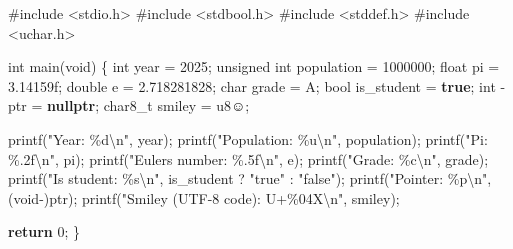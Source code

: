 \documentclass[
  letterpaper,
  DIV=11,
  numbers=noendperiod]{scrreprt}
\newenvironment{Shaded}{\begin{snugshade}}{\end{snugshade}}
\newcommand{\BuiltInTok}[1]{\textcolor[rgb]{0.00,0.23,0.31}{#1}}
\newcommand{\CharTok}[1]{\textcolor[rgb]{0.13,0.47,0.30}{#1}}
\newcommand{\ControlFlowTok}[1]{\textcolor[rgb]{0.00,0.23,0.31}{\textbf{#1}}}
\newcommand{\DataTypeTok}[1]{\textcolor[rgb]{0.68,0.00,0.00}{#1}}
\newcommand{\DecValTok}[1]{\textcolor[rgb]{0.68,0.00,0.00}{#1}}
\newcommand{\FloatTok}[1]{\textcolor[rgb]{0.68,0.00,0.00}{#1}}
\newcommand{\ImportTok}[1]{\textcolor[rgb]{0.00,0.46,0.62}{#1}}
\newcommand{\KeywordTok}[1]{\textcolor[rgb]{0.00,0.23,0.31}{\textbf{#1}}}
\newcommand{\NormalTok}[1]{\textcolor[rgb]{0.00,0.23,0.31}{#1}}
\newcommand{\OperatorTok}[1]{\textcolor[rgb]{0.37,0.37,0.37}{#1}}
\newcommand{\PreprocessorTok}[1]{\textcolor[rgb]{0.68,0.00,0.00}{#1}}
\newcommand{\SpecialCharTok}[1]{\textcolor[rgb]{0.37,0.37,0.37}{#1}}
\newcommand{\StringTok}[1]{\textcolor[rgb]{0.13,0.47,0.30}{#1}}
\begin{document}
\begin{Shaded}
\begin{Highlighting}[]
\PreprocessorTok{\#include }\ImportTok{\textless{}stdio.h\textgreater{}}
\PreprocessorTok{\#include }\ImportTok{\textless{}stdbool.h\textgreater{}}
\PreprocessorTok{\#include }\ImportTok{\textless{}stddef.h\textgreater{}}
\PreprocessorTok{\#include }\ImportTok{\textless{}uchar.h\textgreater{}}

\DataTypeTok{int}\NormalTok{ main}\OperatorTok{(}\DataTypeTok{void}\OperatorTok{)} \OperatorTok{\{}
    \DataTypeTok{int}\NormalTok{ year }\OperatorTok{=} \DecValTok{2025}\OperatorTok{;}
    \DataTypeTok{unsigned} \DataTypeTok{int}\NormalTok{ population }\OperatorTok{=} \DecValTok{1000000}\OperatorTok{;}
    \DataTypeTok{float}\NormalTok{ pi }\OperatorTok{=} \FloatTok{3.14159}\BuiltInTok{f}\OperatorTok{;}
    \DataTypeTok{double}\NormalTok{ e }\OperatorTok{=} \FloatTok{2.718281828}\OperatorTok{;}
    \DataTypeTok{char}\NormalTok{ grade }\OperatorTok{=} \CharTok{\textquotesingle{}A\textquotesingle{}}\OperatorTok{;}
    \DataTypeTok{bool}\NormalTok{ is\_student }\OperatorTok{=} \KeywordTok{true}\OperatorTok{;}
    \DataTypeTok{int} \OperatorTok{{-}}\NormalTok{ptr }\OperatorTok{=} \KeywordTok{nullptr}\OperatorTok{;}
\NormalTok{    char8\_t smiley }\OperatorTok{=} \CharTok{u8\textquotesingle{}☺\textquotesingle{}}\OperatorTok{;}

\NormalTok{    printf}\OperatorTok{(}\StringTok{"Year: }\SpecialCharTok{\%d\textbackslash{}n}\StringTok{"}\OperatorTok{,}\NormalTok{ year}\OperatorTok{);}
\NormalTok{    printf}\OperatorTok{(}\StringTok{"Population: }\SpecialCharTok{\%u\textbackslash{}n}\StringTok{"}\OperatorTok{,}\NormalTok{ population}\OperatorTok{);}
\NormalTok{    printf}\OperatorTok{(}\StringTok{"Pi: }\SpecialCharTok{\%.2f\textbackslash{}n}\StringTok{"}\OperatorTok{,}\NormalTok{ pi}\OperatorTok{);}
\NormalTok{    printf}\OperatorTok{(}\StringTok{"Euler\textquotesingle{}s number: }\SpecialCharTok{\%.5f\textbackslash{}n}\StringTok{"}\OperatorTok{,}\NormalTok{ e}\OperatorTok{);}
\NormalTok{    printf}\OperatorTok{(}\StringTok{"Grade: }\SpecialCharTok{\%c\textbackslash{}n}\StringTok{"}\OperatorTok{,}\NormalTok{ grade}\OperatorTok{);}
\NormalTok{    printf}\OperatorTok{(}\StringTok{"Is student: }\SpecialCharTok{\%s\textbackslash{}n}\StringTok{"}\OperatorTok{,}\NormalTok{ is\_student }\OperatorTok{?} \StringTok{"true"} \OperatorTok{:} \StringTok{"false"}\OperatorTok{);}
\NormalTok{    printf}\OperatorTok{(}\StringTok{"Pointer: }\SpecialCharTok{\%p\textbackslash{}n}\StringTok{"}\OperatorTok{,} \OperatorTok{(}\DataTypeTok{void}\OperatorTok{{-})}\NormalTok{ptr}\OperatorTok{);}
\NormalTok{    printf}\OperatorTok{(}\StringTok{"Smiley (UTF{-}8 code): U+}\SpecialCharTok{\%04X\textbackslash{}n}\StringTok{"}\OperatorTok{,}\NormalTok{ smiley}\OperatorTok{);}

    \ControlFlowTok{return} \DecValTok{0}\OperatorTok{;}
\OperatorTok{\}}
\end{Highlighting}
\end{Shaded}
\end{document}
